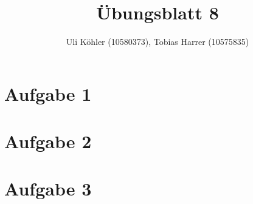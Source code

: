 \documentclass[a4paper,10pt,oneside,leqno]{scrartcl}
\title{Übungsblatt 8}
\author{Uli Köhler (10580373), Tobias Harrer (10575835)}
\begin{document}
\maketitle
\section*{Aufgabe 1}
\section*{Aufgabe 2}
\section*{Aufgabe 3}
\end{document}
